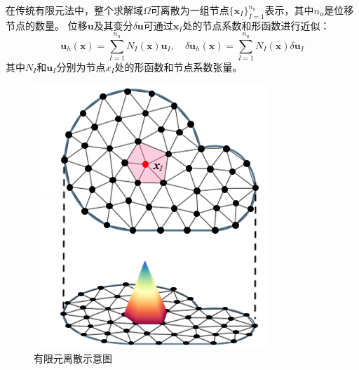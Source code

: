 在传统有限元法中，整个求解域$\Omega$可离散为一组节点$\{\boldsymbol x_I\}_{I=1}^{n_u}$表示\cite{hughes2000}，其中$n_u$是位移节点的数量。
位移$\boldsymbol u$及其变分$\delta \boldsymbol u $可通过$\boldsymbol x_I$处的节点系数和形函数进行近似：
\begin{equation}\label{u_h}
    \boldsymbol u_h(\boldsymbol x) = \sum_{I=1}^{n_u} N_I(\boldsymbol x) \boldsymbol u_I, \quad
    \delta \boldsymbol u_h(\boldsymbol x) = \sum_{I=1}^{n_u} N_I(\boldsymbol x) \delta \boldsymbol u_I
\end{equation}
其中$N_I$和$\boldsymbol u_I$分别为节点$x_I$处的形函数和节点系数张量。
\begin{figure}[H]
    \centering 
        \includegraphics[scale=1.5]{figures/fem.png}
        \caption{有限元离散示意图}\label{fem}
\end{figure}

